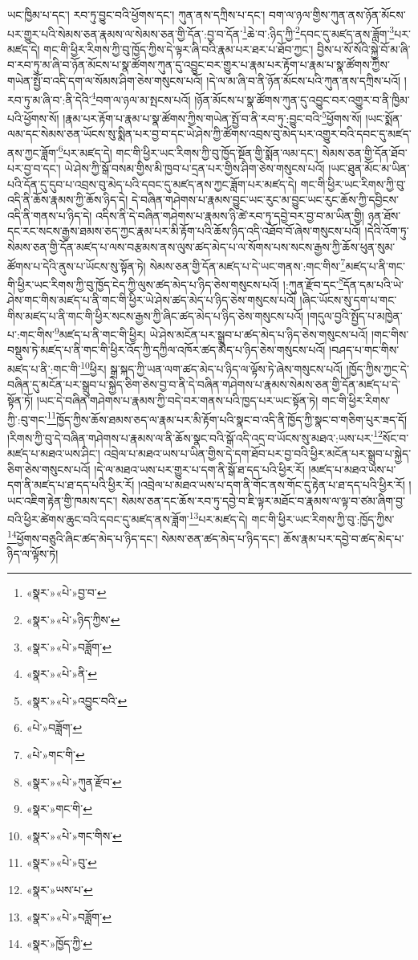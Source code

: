 ཡང་ཁྱིམ་པ་དང་། རབ་ཏུ་བྱུང་བའི་ཕྱོགས་དང་། ཀུན་ནས་དཀྲིས་པ་དང་། བག་ལ་ཉལ་གྱིས་ཀུན་ནས་ཉོན་མོངས་པར་གྱུར་པའི་སེམས་ཅན་རྣམས་ལ་སེམས་ཅན་གྱི་དོན་:བྱ་བ་དོན་\footnote{«སྣར་»«པེ་»བྱ་བ་}ཆེ་བ་:ཉིད་ཀྱི་\footnote{«སྣར་»«པེ་»ཉིད་ཀྱིས་}དབང་དུ་མཛད་ནས་ཟློག་\footnote{«སྣར་»«པེ་»བཟློག་}པར་མཛད་དེ། གང་གི་ཕྱིར་རིགས་ཀྱི་བུ་ཁྱོད་ཀྱིས་དེ་ལྟར་ཞི་བའི་རྣམ་པར་ཐར་པ་ཐོབ་ཀྱང་། བྱིས་པ་སོ་སོའི་སྐྱེ་བོ་མ་ཞི་བ་རབ་ཏུ་མ་ཞི་བ་ཉོན་མོངས་པ་སྣ་ཚོགས་ཀུན་དུ་འབྱུང་བར་གྱུར་པ་རྣམ་པར་རྟོག་པ་རྣམ་པ་སྣ་ཚོགས་ཀྱིས་གཡེན་སྤྱོ་བ་འདི་དག་ལ་སོམས་ཤིག་ཅེས་གསུངས་པའོ། །དེ་ལ་མ་ཞི་བ་ནི་ཉོན་མོངས་པའི་ཀུན་ནས་དཀྲིས་པའོ། །རབ་ཏུ་མ་ཞི་བ་:ནི་དེའི་\footnote{«སྣར་»«པེ་»ནི་}བག་ལ་ཉལ་མ་སྤངས་པའོ། །ཉོན་མོངས་པ་སྣ་ཚོགས་ཀུན་དུ་འབྱུང་བར་འགྱུར་བ་ནི་ཁྱིམ་པའི་ཕྱོགས་སོ། །རྣམ་པར་རྟོག་པ་རྣམ་པ་སྣ་ཚོགས་ཀྱིས་གཡེན་སྤྱོ་བ་ནི་རབ་ཏུ་:བྱུང་བའི་\footnote{«སྣར་»«པེ་»འབྱུང་བའི་}ཕྱོགས་སོ། །ཡང་སྨོན་ལམ་དང་སེམས་ཅན་ཡོངས་སུ་སྨིན་པར་བྱ་བ་དང་ཡེ་ཤེས་ཀྱི་ཚོགས་འབྲས་བུ་མེད་པར་འགྱུར་བའི་དབང་དུ་མཛད་ནས་ཀྱང་ཟློག་\footnote{«པེ་»བཟློག་}པར་མཛད་དེ། གང་གི་ཕྱིར་ཡང་རིགས་ཀྱི་བུ་ཁྱོད་སྔོན་གྱི་སྨོན་ལམ་དང་། སེམས་ཅན་གྱི་དོན་ཐོབ་པར་བྱ་བ་དང་། ཡེ་ཤེས་ཀྱི་སྒོ་བསམ་གྱིས་མི་ཁྱབ་པ་དྲན་པར་གྱིས་ཤིག་ཅེས་གསུངས་པའོ། །ཡང་ཐུན་མོང་མ་ཡིན་པའི་དོན་དུ་དུབ་པ་འབྲས་བུ་མེད་པའི་དབང་དུ་མཛད་ནས་ཀྱང་ཟློག་པར་མཛད་དེ། གང་གི་ཕྱིར་ཡང་རིགས་ཀྱི་བུ་འདི་ནི་ཆོས་རྣམས་ཀྱི་ཆོས་ཉིད་དེ། དེ་བཞིན་གཤེགས་པ་རྣམས་བྱུང་ཡང་རུང་མ་བྱུང་ཡང་རུང་ཆོས་ཀྱི་དབྱིངས་འདི་ནི་གནས་པ་ཉིད་དེ། འདིས་ནི་དེ་བཞིན་གཤེགས་པ་རྣམས་ཉི་ཚེ་རབ་ཏུ་དབྱེ་བར་བྱ་བ་མ་ཡིན་གྱི། ཉན་ཐོས་དང་རང་སངས་རྒྱས་ཐམས་ཅད་ཀྱང་རྣམ་པར་མི་རྟོག་པའི་ཆོས་ཉིད་འདི་འཐོབ་བོ་ཞེས་གསུངས་པའོ། །དེའི་འོག་ཏུ་སེམས་ཅན་གྱི་དོན་མཛད་པ་ལས་བརྩམས་ནས་ལུས་ཚད་མེད་པ་ལ་སོགས་པས་སངས་རྒྱས་ཀྱི་ཆོས་ཕུན་སུམ་ཚོགས་པ་དེའི་ནུས་པ་ཡོངས་སུ་སྟོན་ཏེ། སེམས་ཅན་གྱི་དོན་མཛད་པ་དེ་ཡང་གནས་:གང་གིས་\footnote{«པེ་»གང་གི་}མཛད་པ་ནི་གང་གི་ཕྱིར་ཡང་རིགས་ཀྱི་བུ་ཁྱོད་ངེད་ཀྱི་ལུས་ཚད་མེད་པ་ཉིད་ཅེས་གསུངས་པའོ། །:ཀུན་རྫོབ་དང་\footnote{«སྣར་»«པེ་»ཀུན་རྫོབ་}དོན་དམ་པའི་ཡེ་ཤེས་གང་གིས་མཛད་པ་ནི་གང་གི་ཕྱིར་ཡེ་ཤེས་ཚད་མེད་པ་ཉིད་ཅེས་གསུངས་པའོ། །ཞིང་ཡོངས་སུ་དག་པ་གང་གིས་མཛད་པ་ནི་གང་གི་ཕྱིར་སངས་རྒྱས་ཀྱི་ཞིང་ཚད་མེད་པ་ཉིད་ཅེས་གསུངས་པའོ། །གདུལ་བྱའི་སྤྱོད་པ་མཁྱེན་པ་:གང་གིས་\footnote{«སྣར་»གང་གི་}མཛད་པ་ནི་གང་གི་ཕྱིར། ཡེ་ཤེས་མངོན་པར་སྒྲུབ་པ་ཚད་མེད་པ་ཉིད་ཅེས་གསུངས་པའོ། །གང་གིས་བསྡུས་ཏེ་མཛད་པ་ནི་གང་གི་ཕྱིར་འོད་ཀྱི་དཀྱིལ་འཁོར་ཚད་མེད་པ་ཉིད་ཅེས་གསུངས་པའོ། །བཤད་པ་གང་གིས་མཛད་པ་ནི་:གང་གི་\footnote{«སྣར་»«པེ་»གང་གིས་}ཕྱིར། སྒྲ་སྐད་ཀྱི་ཡན་ལག་ཚད་མེད་པ་ཉིད་ལ་ལྟོས་ཏེ་ཞེས་གསུངས་པའོ། །ཁྱོད་ཀྱིས་ཀྱང་དེ་བཞིན་དུ་མངོན་པར་སྒྲུབ་པ་སྐྱེད་ཅིག་ཅེས་བྱ་བ་ནི་དེ་བཞིན་གཤེགས་པ་རྣམས་སེམས་ཅན་གྱི་དོན་མཛད་པ་དེ་སྟོན་ཏོ། །ཡང་དེ་བཞིན་གཤེགས་པ་རྣམས་ཀྱི་བདེ་བར་གནས་པའི་ཁྱད་པར་ཡང་སྟོན་ཏེ། གང་གི་ཕྱིར་རིགས་ཀྱི་:བུ་གང་\footnote{«སྣར་»«པེ་»བུ་}ཁྱོད་ཀྱིས་ཆོས་ཐམས་ཅད་ལ་རྣམ་པར་མི་རྟོག་པའི་སྣང་བ་འདི་ནི་ཁྱོད་ཀྱི་སྣང་བ་གཅིག་པུར་ཟད་དོ། །རིགས་ཀྱི་བུ་དེ་བཞིན་གཤེགས་པ་རྣམས་ལ་ནི་ཆོས་སྣང་བའི་སྒོ་འདི་འདྲ་བ་ཡོངས་སུ་མཐའ་:ཡས་པར་\footnote{«སྣར་»ཡས་པ་}སོང་བ་མཛད་པ་མཐའ་ཡས་ཤིང་། འབྲེལ་པ་མཐའ་ཡས་པ་ཡིན་གྱིས་དེ་དག་ཐོབ་པར་བྱ་བའི་ཕྱིར་མངོན་པར་སྒྲུབ་པ་སྐྱེད་ཅིག་ཅེས་གསུངས་པའོ། །དེ་ལ་མཐའ་ཡས་པར་གྱུར་པ་དག་ནི་སྒོ་ཐ་དད་པའི་ཕྱིར་རོ། །མཛད་པ་མཐའ་ཡས་པ་དག་ནི་མཛད་པ་ཐ་དད་པའི་ཕྱིར་རོ། །འབྲེལ་པ་མཐའ་ཡས་པ་དག་ནི་གོང་ནས་གོང་དུ་རྟེན་པ་ཐ་དད་པའི་ཕྱིར་རོ། །ཡང་འཇིག་རྟེན་གྱི་ཁམས་དང་། སེམས་ཅན་དང་ཆོས་རབ་ཏུ་དབྱེ་བ་ཇི་ལྟར་མཐོང་བ་རྣམས་ལ་ལྟ་བ་ཙམ་ཞིག་བྱ་བའི་ཕྱིར་ཚེགས་ཆུང་བའི་དབང་དུ་མཛད་ནས་ཟློག་\footnote{«སྣར་»«པེ་»བཟློག་}པར་མཛད་དེ། གང་གི་ཕྱིར་ཡང་རིགས་ཀྱི་བུ་:ཁྱོད་ཀྱིས་\footnote{«སྣར་»ཁྱོད་ཀྱི་}ཕྱོགས་བཅུའི་ཞིང་ཚད་མེད་པ་ཉིད་དང་། སེམས་ཅན་ཚད་མེད་པ་ཉིད་དང་། ཆོས་རྣམ་པར་དབྱེ་བ་ཚད་མེད་པ་ཉིད་ལ་ལྟོས་ཏེ། 